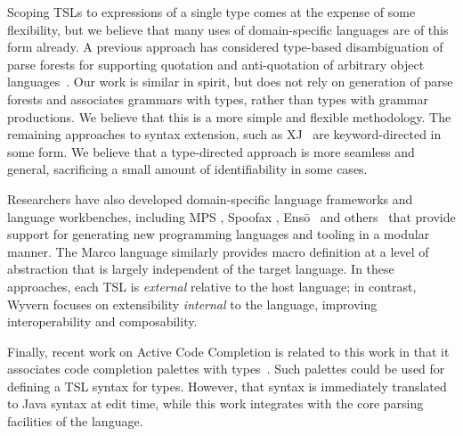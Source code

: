 Scoping TSLs to expressions of a single type comes at the expense of some flexibility, but we believe that many uses of domain-specific languages are of this form already. A previous approach has considered type-based disambiguation of parse forests for supporting quotation and anti-quotation of arbitrary object languages~\cite{bravenboer2005generalized}. Our work is similar in spirit, but does not rely on generation of parse forests and associates grammars with types, rather than types with grammar productions. We believe that this is a more simple and flexible methodology. The remaining approaches to syntax extension, such as XJ~\cite{DBLP:conf/scam/ClarkSW08} are keyword-directed in some form. We believe that a type-directed approach is more seamless and general, sacrificing a small amount of identifiability in some cases.

Researchers have also developed domain-specific language frameworks and language workbenches, including MPS \cite{mps}, Spoofax \cite{KatsVisser2010}, Ens\={o}~\cite{enso} and others~\cite{krahn2008monticore,van1992pregmatic} that provide support for generating new programming languages and tooling in a modular manner.  
The Marco language \cite{lee:2012:marco} similarly provides macro definition at a level of abstraction that is largely independent of the target language.
In these approaches, each TSL is \emph{external} relative to the host language;
in contrast, Wyvern focuses on extensibility \emph{internal} to the language,
improving interoperability and composability.

Finally, recent work on Active Code Completion is related to this work in that
it associates code completion palettes with types~\cite{omar2012active}. Such
palettes could be used for defining a TSL syntax for types. However, that syntax
is immediately translated to Java syntax at edit time, while this work
integrates with the core parsing facilities of the language.



